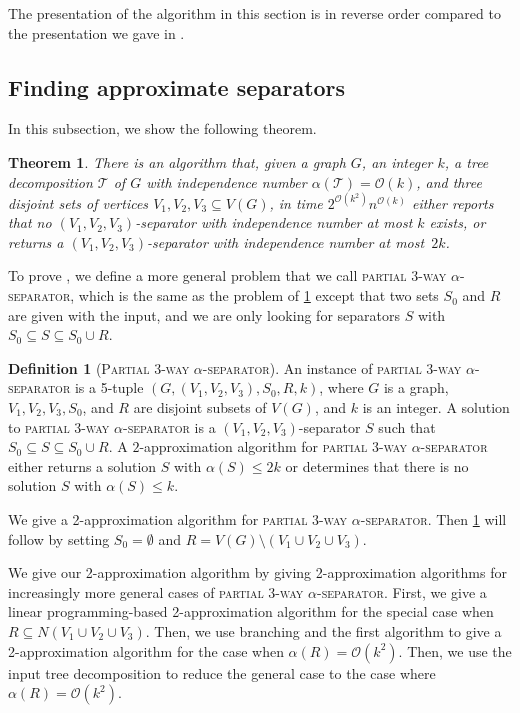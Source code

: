 \documentclass[11pt]{article}
\newtheorem{theorem}{Theorem}[section]
\theoremstyle{definition}
\newtheorem{definition}{Definition}[section]
\newcommand{\td}{\mathcal{T}}
\newcommand{\OO}{\mathcal{O}}
\begin{document}
The presentation of the algorithm in this section is in reverse order compared to the presentation we gave in  .


\subsection{Finding approximate separators\label{subsec:apxsep}}
In this subsection, we show the following theorem.

\begin{theorem}
\label{the:sepfinding}
There is an algorithm that, given a graph $G$, an integer $k$, a tree decomposition $\td$ of $G$ with independence number $\alpha(\td) = \OO(k)$, and three disjoint sets of vertices $V_1, V_2, V_3 \subseteq V(G)$, in time $2^{\OO(k^2)} n^{\OO(k)}$ either reports that no $(V_1, V_2, V_3)$-separator with independence number at most $k$ exists, or returns a $(V_1, V_2, V_3)$-separator with independence number at most~$2k$.
\end{theorem}



To prove , we define a more general problem that we call \textsc{partial $3$-way $\alpha$-separator}, which is the same as the problem of \cref{the:sepfinding} except that two sets $S_0$ and $R$ are given with the input, and we are only looking for separators $S$ with $S_0 \subseteq S \subseteq S_0 \cup R$.

\begin{definition}[\textsc{Partial 3-way $\alpha$-separator}]
An instance of \textsc{partial 3-way $\alpha$-separator} is a 5-tuple $(G, (V_1, V_2, V_3), S_0, R, k)$, where $G$ is a graph, $V_1, V_2, V_3, S_0$, and $R$ are disjoint subsets of $V(G)$, and $k$ is an integer.
A solution to \textsc{partial 3-way $\alpha$-separator} is a $(V_1, V_2, V_3)$-separator $S$ such that $S_0 \subseteq S \subseteq S_0 \cup R$.
A $2$-approximation algorithm for \textsc{partial 3-way $\alpha$-separator} either returns a solution $S$ with $\alpha(S) \le 2k$ or determines that there is no solution $S$ with $\alpha(S) \le k$.
\end{definition}

We give a 2-approximation algorithm for \textsc{partial 3-way $\alpha$-separator}.
Then \cref{the:sepfinding} will follow by setting $S_0 = \emptyset$ and $R = V(G) \setminus (V_1 \cup V_2 \cup V_3)$.

We give our 2-approximation algorithm by giving 2-approximation algorithms for increasingly more general cases of \textsc{partial 3-way $\alpha$-separator}.
First, we give a linear programming-based 2-approximation algorithm for the special case when $R \subseteq N(V_1 \cup V_2 \cup V_3)$.
Then, we use branching and the first algorithm to give a 2-approximation algorithm for the case when $\alpha(R) = \OO(k^2)$.
Then, we use the input tree decomposition to reduce the general case to the case where $\alpha(R) = \OO(k^2)$.
\end{document}
